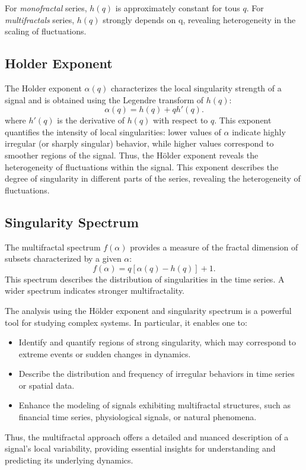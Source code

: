 \documentclass[11pt]{extarticle}
\begin{document}
For \emph{monofractal} series, $h(q)$ is approximately constant for tous $q$.
For \emph{multifractals} series, $h(q)$ strongly depends on q, revealing heterogeneity in the scaling of fluctuations.


\subsection{Holder Exponent}
The Holder exponent $\alpha(q)$ characterizes the local singularity strength of a signal and is obtained using the Legendre transform of $h(q)$:
\begin{equation}
\alpha(q) = h(q) + q h'(q).
\end{equation}
where $h'(q)$ is the derivative of $h(q)$ with respect to $q$. This exponent quantifies the intensity of local singularities: lower values of $\alpha$ indicate highly irregular (or sharply singular) behavior, while higher values correspond to smoother regions of the signal. Thus, the Hölder exponent reveals the heterogeneity of fluctuations within the signal.
This exponent describes the degree of singularity in different parts of the series, revealing the heterogeneity of fluctuations.

\subsection{Singularity Spectrum}
The multifractal spectrum $f(\alpha)$ provides a measure of the fractal dimension of subsets characterized by a given $\alpha$:
\begin{equation}
f(\alpha) = q [\alpha(q) - h(q)] + 1.
\end{equation}
This spectrum describes the distribution of singularities in the time series. A wider spectrum indicates stronger multifractality.

The analysis using the Hölder exponent and singularity spectrum is a powerful tool for studying complex systems. In particular, it enables one to:
\begin{itemize}
    \item Identify and quantify regions of strong singularity, which may correspond to extreme events or sudden changes in dynamics.
    \item Describe the distribution and frequency of irregular behaviors in time series or spatial data.
    \item Enhance the modeling of signals exhibiting multifractal structures, such as financial time series, physiological signals, or natural phenomena.
\end{itemize}
Thus, the multifractal approach offers a detailed and nuanced description of a signal's local variability, providing essential insights for understanding and predicting its underlying dynamics. \\
\end{document}

